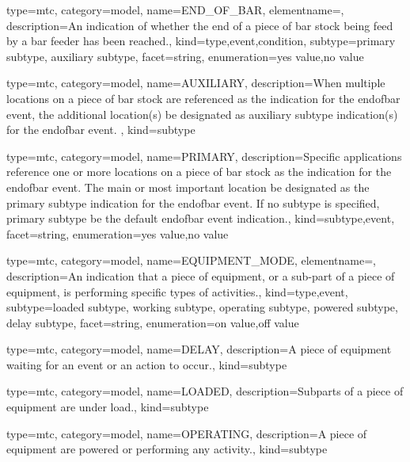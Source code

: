{
  type=mtc,
  category=model,
  name={END\_OF\_BAR},
  elementname=,
  description={An indication of whether the end of a piece of bar stock being feed by a bar feeder has been reached.},
  kind={type,event,condition},
  subtype={\gls{primary subtype}, \gls{auxiliary subtype}},
  facet={\gls{string}},
  enumeration={\gls{yes value},\gls{no value}}
}


{
  type=mtc,
  category=model,
  name={AUXILIARY},
  description={When multiple locations on a piece of bar stock are referenced as the indication for the \gls{endofbar event}, the additional location(s) \must be designated as \gls{auxiliary subtype} indication(s) for the \gls{endofbar event}.  },
  kind={subtype}
}


{
  type=mtc,
  category=model,
  name={PRIMARY},
  description={Specific applications \MAY reference one or more locations on a piece of bar stock as the indication for the \gls{endofbar event}. The main or most important location \must be designated as the \gls{primary subtype} indication for the \gls{endofbar event}.   \newline If no \gls{subtype} is specified, \gls{primary subtype} \must be the default \gls{endofbar event} indication.},
  kind={subtype,event},
  facet={\gls{string}},
  enumeration={\gls{yes value},\gls{no value}}
}


{
  type=mtc,
  category=model,
  name={EQUIPMENT\_MODE},
  elementname=,
  description={An indication that a piece of equipment, or a sub-part of a piece of equipment, is performing specific types of activities.},
  kind={type,event},
  subtype={\gls{loaded subtype}, \gls{working subtype}, \gls{operating subtype}, \gls{powered subtype}, \gls{delay subtype}},
  facet={\gls{string}},
  enumeration={\gls{on value},\gls{off value}}
}


{
  type=mtc,
  category=model,
  name={DELAY},
  description={A piece of equipment waiting for an event or an action to occur.},
  kind={subtype}
}


{
  type=mtc,
  category=model,
  name={LOADED},
  description={Subparts of a piece of equipment are under load.},
  kind={subtype}
}


{
  type=mtc,
  category=model,
  name={OPERATING},
  description={A piece of equipment are powered or performing any activity.},
  kind={subtype}
}


